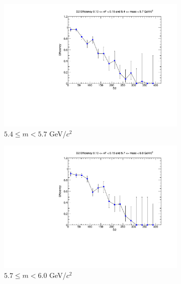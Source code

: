 \documentclass[11pt]{article}
\begin{document}
\begin{figure}[p]
\begin{subfigure}[b]{0.32\textwidth}
        \includegraphics[width=\textwidth]{./kTrackerEfficiencyPlots/D2_Efficiency_xF2_mass4.pdf}
        \caption{$5.4 \leq m < 5.7$ GeV/$c^2$}
    \end{subfigure}\hfill
    \begin{subfigure}[b]{0.32\textwidth}
        \centering
        \includegraphics[width=\textwidth]{./kTrackerEfficiencyPlots/D2_Efficiency_xF2_mass5.pdf}
        \caption{$5.7 \leq m < 6.0$ GeV/$c^2$}
    \end{subfigure}\vspace{0.5cm}
    \begin{subfigure}[b]{0.32\textwidth}
        \centering

\end{subfigure}
\end{figure}
\end{document}
